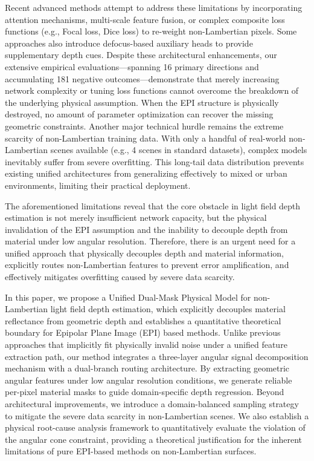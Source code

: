 \documentclass[lettersize,journal]{IEEEtran}
\begin{document}
Recent advanced methods attempt to address these limitations by incorporating attention mechanisms, multi-scale feature fusion, or complex composite loss functions (e.g., Focal loss, Dice loss) to re-weight non-Lambertian pixels. Some approaches also introduce defocus-based auxiliary heads to provide supplementary depth cues. Despite these architectural enhancements, our extensive empirical evaluations---spanning 16 primary directions and accumulating 181 negative outcomes---demonstrate that merely increasing network complexity or tuning loss functions cannot overcome the breakdown of the underlying physical assumption. When the EPI structure is physically destroyed, no amount of parameter optimization can recover the missing geometric constraints. Another major technical hurdle remains the extreme scarcity of non-Lambertian training data. With only a handful of real-world non-Lambertian scenes available (e.g., 4 scenes in standard datasets), complex models inevitably suffer from severe overfitting. This long-tail data distribution prevents existing unified architectures from generalizing effectively to mixed or urban environments, limiting their practical deployment.

The aforementioned limitations reveal that the core obstacle in light field depth estimation is not merely insufficient network capacity, but the physical invalidation of the EPI assumption and the inability to decouple depth from material under low angular resolution. Therefore, there is an urgent need for a unified approach that physically decouples depth and material information, explicitly routes non-Lambertian features to prevent error amplification, and effectively mitigates overfitting caused by severe data scarcity.

In this paper, we propose a Unified Dual-Mask Physical Model for non-Lambertian light field depth estimation, which explicitly decouples material reflectance from geometric depth and establishes a quantitative theoretical boundary for Epipolar Plane Image (EPI) based methods. Unlike previous approaches that implicitly fit physically invalid noise under a unified feature extraction path, our method integrates a three-layer angular signal decomposition mechanism with a dual-branch routing architecture. By extracting geometric angular features under low angular resolution conditions, we generate reliable per-pixel material masks to guide domain-specific depth regression. Beyond architectural improvements, we introduce a domain-balanced sampling strategy to mitigate the severe data scarcity in non-Lambertian scenes. We also establish a physical root-cause analysis framework to quantitatively evaluate the violation of the angular cone constraint, providing a theoretical justification for the inherent limitations of pure EPI-based methods on non-Lambertian surfaces.
\end{document}
